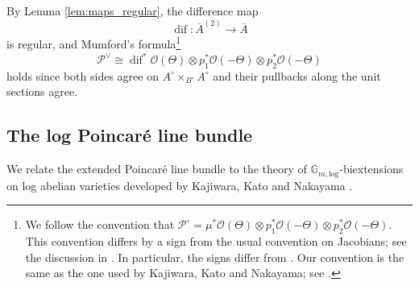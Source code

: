 \documentclass[11pt]{article}
\def\Glog{\mathbb{G}_{m,\log}}
\renewcommand{\log}{\mathrm{log}}
\newcommand{\barA}{\overline{A}}
\newcommand{\diff}{\operatorname{dif}}
\theoremstyle{definition}
\begin{document}
By Lemma \ref{lem:maps_regular}, the difference map
$$
\diff : \barA^{(2)} \to \barA
$$
is regular, and Mumford's formula\footnote{We follow the convention that $\mathcal P^{\circ} = \mu^*\mathcal O(\Theta) \otimes p_1^*\mathcal O(-\Theta) \otimes p_2^*\mathcal O(-\Theta)$. This convention differs by a sign from the usual convention on Jacobians; see the discussion in \cite[(1.6.)]{beauvilleSL2}. In particular, the signs differ from \cite{BMP}. Our convention is the same as the one used by Kajiwara, Kato and Nakayama; see \cite[Proposition 2.4.]{KKN5}.}
\begin{equation}\label{eq:Mumform}
    \mathcal P^{\vee} \cong \diff^* \mathcal O(\Theta) \otimes p_1^*\mathcal O(-\Theta) \otimes p_2^*\mathcal O(-\Theta)
\end{equation}
holds since both sides agree on $A^\circ \times_{B^\circ}A^\circ$ and their pullbacks along the unit sections agree.

\subsection{The log Poincar\'e line bundle}\label{sec:Plog}

We relate the extended Poincar\'e line bundle to the theory of
$\Glog$-biextensions on log abelian varieties developed by Kajiwara,
Kato and Nakayama \cite{KKN2, KKN4, KKN5, KKN7}.
\end{document}

